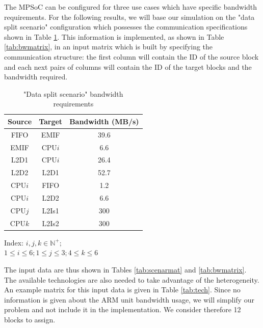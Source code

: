 The MPSoC can be configured for three use cases which have specific bandwidth requirements. For the following results, we will base our simulation on the "data split scenario" configuration which possesses the communication specifications shown in Table \ref{tab:3mfbw}. This information is implemented, as shown in Table \ref{tab:bwmatrix}, in an input matrix which is built by specifying the communication structure: the first column will contain the ID of the source block and each next pairs of columns will contain the ID of the target blocks and the bandwidth required.

\begin{table}[h!]
\caption{"Data split scenario" bandwidth requirements}
\begin{center}
\begin{scriptsize}
\begin{tabular}{|c|c|c|}
\hline Source & Target & Bandwidth (MB/s)\\
\hline FIFO & EMIF & 39.6\\
EMIF & CPU$i$ & 6.6\\
L2D1 & CPU$i$ & 26.4\\
L2D2 & L2D1 & 52.7\\
CPU$i$ & FIFO & 1.2\\
CPU$i$ & L2D2 & 6.6\\
CPU$j$ & L2Is1 & 300\\
CPU$k$ & L2Is2 & 300\\
\hline
\end{tabular}
\end{scriptsize}
\end{center}
\begin{center}
Index: $i, j, k \in \mathbb{N}^{+};$\\
$1 \leq i \leq 6; 1\leq j \leq 3; 4 \leq k \leq 6$
\end{center}
\label{tab:3mfbw}
\end{table}

The input data are thus shown in Tables \ref{tab:scenarmat} and \ref{tab:bwmatrix}. The available technologies are also needed to take advantage of the heterogeneity. An example matrix for this input data is given in Table \ref{tab:tech}. Since no information is given about the ARM unit bandwidth usage, we will simplify our problem and not include it in the implementation. We consider therefore 12 blocks to assign.

